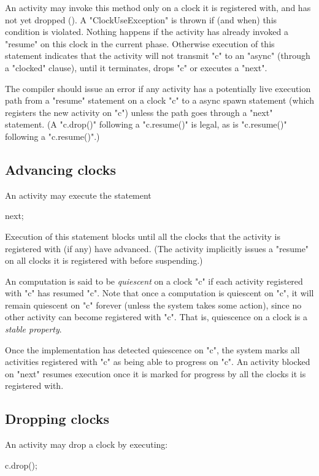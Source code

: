 An activity may invoke this method only on a clock it is registered
with, and has not yet dropped (). A \xcd"ClockUseException" is thrown if (and
when) this condition is violated.  Nothing happens if the activity has
already invoked a \xcd"resume" on this clock in the current phase.
Otherwise execution of this statement indicates that the activity will
not transmit \xcd"c" to an \xcd"async" (through a \xcd"clocked"
clause),
until it terminates, drops \xcd"c" or executes a \xcd"next". 

\begin{staticrule*}
The compiler should issue an error if any activity has a potentially
live execution path from a \xcd"resume" statement on a clock \xcd"c"
to a
async spawn statement (which registers the new
activity on \xcd"c") unless the path goes through a \xcd"next"
statement. (A \xcd"c.drop()" following a \xcd"c.resume()" is legal,
as is \xcd"c.resume()" following a \xcd"c.resume()".)
\end{staticrule*}

\subsection{Advancing clocks}\label{sec:clock:next}
An activity may execute the statement
\begin{xten}
next;
\end{xten}

\noindent 
Execution of this statement blocks until all the clocks that the
activity is registered with (if any) have advanced. (The activity
implicitly issues a \xcd"resume" on all clocks it is registered
with before suspending.)

An \Xten{} computation is said to be {\em quiescent} on a clock
\xcd"c" if each activity registered with \xcd"c" has resumed \xcd"c".
Note that once a computation is quiescent on \xcd"c", it will remain
quiescent on \xcd"c" forever (unless the system takes some action),
since no other activity can become registered with \xcd"c".  That is,
quiescence on a clock is a {\em stable property}.

Once the implementation has detected quiescence on \xcd"c", the system
marks all activities registered with \xcd"c" as being able to progress
on \xcd"c". An activity blocked on \xcd"next" resumes execution once
it is marked for progress by all the clocks it is registered with.

\subsection{Dropping clocks}\label{sec:clock:drop}
An activity may drop a clock by executing:
\begin{xten}
c.drop();
\end{xten}

